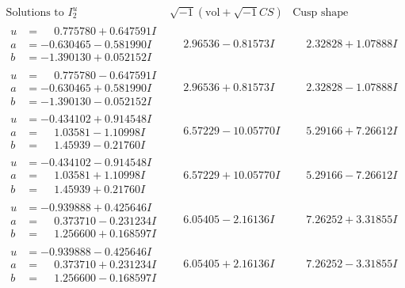 \documentclass[1p]{elsarticle_modified}
\theoremstyle{definition}
\newcommand{\I}{\sqrt{-1}}
\begin{document}
$$\begin{array}{c|c|c}  
\text{Solutions to }I^u_{2}& \I (\text{vol} + \sqrt{-1}CS) & \text{Cusp shape}\\
 \hline 
\begin{aligned}
u &= \phantom{-}0.775780 + 0.647591 I \\
a &= -0.630465 - 0.581990 I \\
b &= -1.390130 + 0.052152 I\end{aligned}
 & \phantom{-}2.96536 - 0.81573 I & \phantom{-}2.32828 + 1.07888 I \\ \hline\begin{aligned}
u &= \phantom{-}0.775780 - 0.647591 I \\
a &= -0.630465 + 0.581990 I \\
b &= -1.390130 - 0.052152 I\end{aligned}
 & \phantom{-}2.96536 + 0.81573 I & \phantom{-}2.32828 - 1.07888 I \\ \hline\begin{aligned}
u &= -0.434102 + 0.914548 I \\
a &= \phantom{-}1.03581 - 1.10998 I \\
b &= \phantom{-}1.45939 - 0.21760 I\end{aligned}
 & \phantom{-}6.57229 - 10.05770 I & \phantom{-}5.29166 + 7.26612 I \\ \hline\begin{aligned}
u &= -0.434102 - 0.914548 I \\
a &= \phantom{-}1.03581 + 1.10998 I \\
b &= \phantom{-}1.45939 + 0.21760 I\end{aligned}
 & \phantom{-}6.57229 + 10.05770 I & \phantom{-}5.29166 - 7.26612 I \\ \hline\begin{aligned}
u &= -0.939888 + 0.425646 I \\
a &= \phantom{-}0.373710 - 0.231234 I \\
b &= \phantom{-}1.256600 + 0.168597 I\end{aligned}
 & \phantom{-}6.05405 - 2.16136 I & \phantom{-}7.26252 + 3.31855 I \\ \hline\begin{aligned}
u &= -0.939888 - 0.425646 I \\
a &= \phantom{-}0.373710 + 0.231234 I \\
b &= \phantom{-}1.256600 - 0.168597 I\end{aligned}
 & \phantom{-}6.05405 + 2.16136 I & \phantom{-}7.26252 - 3.31855 I \\ \hline\begin{aligned}

\end{aligned}
\end{array}$$
\end{document}
